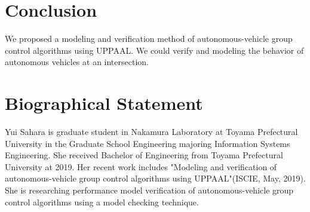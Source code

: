 \documentclass[]{article}
\begin{document}
\section{Conclusion}
	We proposed a modeling and verification method of autonomous-vehicle group control algorithms using UPPAAL. We could verify and modeling the behavior of autonomous vehicles at an intersection.
\section*{Biographical Statement}
Yui Sahara is graduate student in Nakamura Laboratory at Toyama Prefectural University in the Graduate School Engineering majoring Information Systems Engineering.  She received Bachelor of Engineering from Toyama Prefectural University at 2019.  Her recent work includes "Modeling and verification of autonomous-vehicle group control algorithms using UPPAAL"(ISCIE, May, 2019).  She is researching performance model verification of autonomous-vehicle group control algorithms using a model checking technique.
\begin{thebibliography}{2}
\end{thebibliography}
\end{document}
